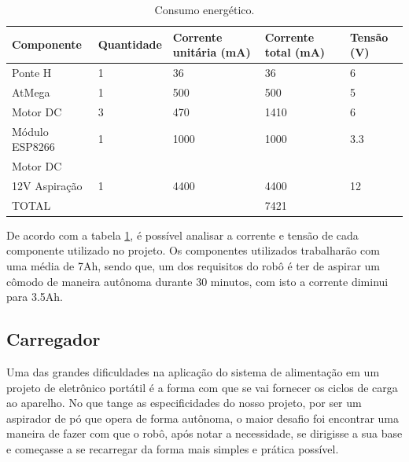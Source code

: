 		\begin{table}[H]
		\centering
		\caption{Consumo energético.}
		\label{tab:consumo_energético}
		\begin{tabular}{lllll}
		Componente               & Quantidade & Corrente unitária (mA) & Corrente total (mA) & Tensão (V) \\ \hline
		Ponte H                & 1          & 36                     & 36                  & 6          \\ \hline
		AtMega                 & 1          & 500                    & 500                 & 5          \\ \hline
		Motor DC               & 3          & 470                    & 1410                & 6          \\ \hline
		Módulo ESP8266         & 1          & 1000                   & 1000                & 3.3        \\ \hline
		Motor DC \\ 12V Aspiração & 1           & 4400                   & 4400                & 12         \\ \hline
		TOTAL                  &            &                        & 7421                & \\ \hline          
		\end{tabular}
		\end{table}

		De acordo com a tabela \ref{tab:consumo_energético}, é possível analisar a corrente e tensão de cada componente utilizado no projeto. Os componentes utilizados trabalharão com uma média de 7Ah, sendo que, um dos requisitos do robô é ter de aspirar um cômodo de maneira autônoma durante 30 minutos, com isto a corrente diminui para 3.5Ah.



	\subsection{Carregador} %
	\label{sub:carregador}
	
		Uma das grandes dificuldades na aplicação do sistema de alimentação em um projeto de eletrônico portátil é a forma com que se vai fornecer os ciclos de carga ao aparelho. No que tange as especificidades do nosso projeto, por ser um aspirador de pó que opera de forma autônoma, o maior desafio foi encontrar uma maneira de fazer com que o robô, após notar a necessidade, se dirigisse a sua base e começasse a se recarregar da forma mais simples e prática possível. 

